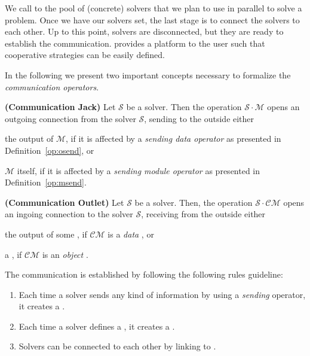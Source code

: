 We call \soset{} to the pool of (concrete) solvers that we plan to use in parallel to solve a problem. Once we have our solvers set, the last stage is to connect the solvers to each other. Up to this point, solvers are disconnected, but they are ready to establish the communication. \posl{} provides a platform  to the user such that cooperative strategies can be easily defined.

In the following we present two important concepts necessary to formalize the {\it communication operators}.

\begin{definition}\label{def:comm_jack}
{\bf (Communication Jack)} Let $\mathcal{S}$ be a solver. Then the operation $\mathcal{S}\cdot\mathcal{M}$ opens an outgoing connection from the solver $\mathcal{S}$, sending to the outside either 
\begin{inparaenum}[a)]
	\item the output of $\mathcal{M}$, if it is affected by a {\it sending data operator} as presented in Definition~\ref{op:osend}, or
	\item $\mathcal{M}$ itself, if it is affected by a {\it sending module operator} as presented in Definition~\ref{op:msend}.
\end{inparaenum}
\end{definition} 

\begin{definition}\label{def:comm_outlet}
{\bf (Communication Outlet)} Let $\mathcal{S}$ be a solver. Then, the operation $\mathcal{S}\cdot\mathcal{CM}$ opens an ingoing connection to the solver $\mathcal{S}$, receiving from the outside either 
\begin{inparaenum}[a)]
	\item the output of some \om{}, if $\mathcal{CM}$ is a {\it data} \opch{}, or
	\item a \om{}, if $\mathcal{CM}$ is an {\it object} \opch.
\end{inparaenum}
\end{definition} 


The communication is established by following the following rules guideline:
\begin{enumerate}%
	\item Each time a solver sends any kind of information by using a {\it sending} operator, it creates a \jack.
	\item Each time a solver defines a \opch, it creates a \outlet. 
	\item Solvers can be connected to each other by linking \jacks{} to \outlets.
\end{enumerate} %

